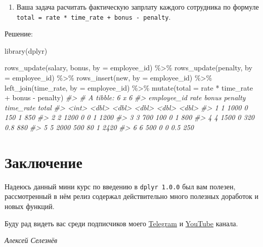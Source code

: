 \documentclass[
]{book}
\newenvironment{Shaded}{\begin{snugshade}}{\end{snugshade}}
\newcommand{\AttributeTok}[1]{\textcolor[rgb]{0.77,0.63,0.00}{#1}}
\newcommand{\CommentTok}[1]{\textcolor[rgb]{0.56,0.35,0.01}{\textit{#1}}}
\newcommand{\FunctionTok}[1]{\textcolor[rgb]{0.00,0.00,0.00}{#1}}
\newcommand{\NormalTok}[1]{#1}
\newcommand{\SpecialCharTok}[1]{\textcolor[rgb]{0.00,0.00,0.00}{#1}}
\newcommand{\StringTok}[1]{\textcolor[rgb]{0.31,0.60,0.02}{#1}}
\providecommand{\tightlist}{%
  \setlength{\itemsep}{0pt}\setlength{\parskip}{0pt}}
\begin{document}
\begin{enumerate}
\def\labelenumi{\arabic{enumi}.}
\tightlist
\item
  Ваша задача расчитать фактическую запрлату каждого сотрудника по формуле \texttt{total\ =\ rate\ *\ time\_rate\ +\ bonus\ -\ penalty}.
\end{enumerate}

Решение:

\begin{Shaded}
\begin{Highlighting}[]
\FunctionTok{library}\NormalTok{(dplyr)}

\FunctionTok{rows\_update}\NormalTok{(salary, bonus, }\AttributeTok{by =} \StringTok{\textquotesingle{}employee\_id\textquotesingle{}}\NormalTok{) }\SpecialCharTok{\%\textgreater{}\%} 
  \FunctionTok{rows\_update}\NormalTok{(penalty, }\AttributeTok{by =} \StringTok{\textquotesingle{}employee\_id\textquotesingle{}}\NormalTok{) }\SpecialCharTok{\%\textgreater{}\%} 
  \FunctionTok{rows\_insert}\NormalTok{(new, }\AttributeTok{by =} \StringTok{\textquotesingle{}employee\_id\textquotesingle{}}\NormalTok{) }\SpecialCharTok{\%\textgreater{}\%} 
  \FunctionTok{left\_join}\NormalTok{(time\_rate, }\AttributeTok{by =} \StringTok{\textquotesingle{}employee\_id\textquotesingle{}}\NormalTok{) }\SpecialCharTok{\%\textgreater{}\%} 
  \FunctionTok{mutate}\NormalTok{(}\AttributeTok{total =}\NormalTok{ rate }\SpecialCharTok{*}\NormalTok{ time\_rate }\SpecialCharTok{+}\NormalTok{ bonus }\SpecialCharTok{{-}}\NormalTok{ penalty)}
\CommentTok{\#\textgreater{} \# A tibble: 6 x 6}
\CommentTok{\#\textgreater{}   employee\_id  rate bonus penalty time\_rate total}
\CommentTok{\#\textgreater{}         \textless{}int\textgreater{} \textless{}dbl\textgreater{} \textless{}dbl\textgreater{}   \textless{}dbl\textgreater{}     \textless{}dbl\textgreater{} \textless{}dbl\textgreater{}}
\CommentTok{\#\textgreater{} 1           1  1000     0     150       1     850}
\CommentTok{\#\textgreater{} 2           2  1200     0       0       1    1200}
\CommentTok{\#\textgreater{} 3           3   700   100       0       1     800}
\CommentTok{\#\textgreater{} 4           4  1500     0     320       0.8   880}
\CommentTok{\#\textgreater{} 5           5  2000   500      80       1    2420}
\CommentTok{\#\textgreater{} 6           6   500     0       0       0.5   250}
\end{Highlighting}
\end{Shaded}

\hypertarget{ux437ux430ux43aux43bux44eux447ux435ux43dux438ux435}{%
\chapter*{Заключение}\label{ux437ux430ux43aux43bux44eux447ux435ux43dux438ux435}}

Надеюсь данный мини курс по введению в \texttt{dplyr\ 1.0.0} был вам полезен, рассмотренный в нём релиз содержал действительно много полезных доработок и новых функций.

Буду рад видеть вас среди подписчиков моего \href{https://t.me/R4marketing}{Telegram} и \href{https://www.youtube.com/R4marketing/?sub_confirmation=1}{YouTube} канала.

\emph{Алексей Селезнёв}
\end{document}
